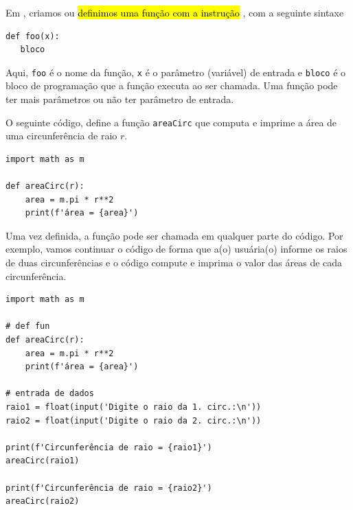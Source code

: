 Em {\python}, criamos ou \hl{definimos uma função com a instrução {\PYTHONdef}}, com a seguinte sintaxe

\begin{lstlisting}
def foo(x):
   bloco
\end{lstlisting}

Aqui, \lstinline+foo+ é o nome da função, \lstinline+x+ é o parâmetro (variável) de entrada e \lstinline+bloco+ é o bloco de programação que a função executa ao ser chamada. Uma função pode ter mais parâmetros ou não ter parâmetro de entrada.

\begin{ex}\label{cap_fun_sec_def:ex:areaCirc}
  O seguinte código, define a função \lstinline+areaCirc+ que computa e imprime a área de uma circunferência de raio $r$.

\begin{lstlisting}
import math as m

def areaCirc(r):
    area = m.pi * r**2
    print(f'área = {area}')
\end{lstlisting}

Uma vez definida, a função pode ser chamada em qualquer parte do código. Por exemplo, vamos continuar o código de forma que a(o) usuária(o) informe os raios de duas circunferências e o código compute e imprima o valor das áreas de cada circunferência.

\begin{lstlisting}
import math as m

# def fun
def areaCirc(r):
    area = m.pi * r**2
    print(f'área = {area}')
    
# entrada de dados
raio1 = float(input('Digite o raio da 1. circ.:\n'))
raio2 = float(input('Digite o raio da 2. circ.:\n'))

print(f'Circunferência de raio = {raio1}')
areaCirc(raio1)

print(f'Circunferência de raio = {raio2}')
areaCirc(raio2)
\end{lstlisting}

\end{ex}

